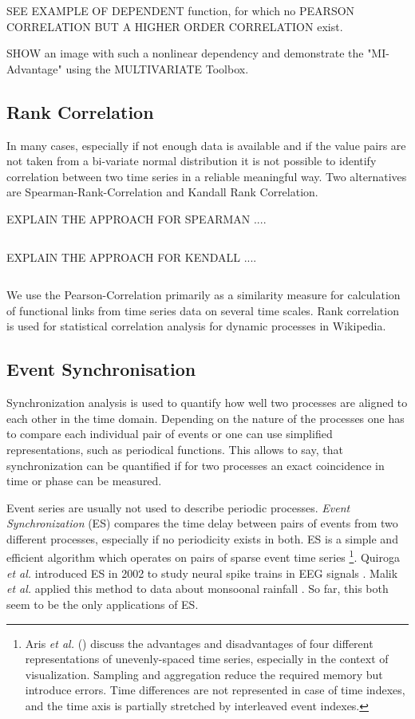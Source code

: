 \documentclass[a4paper,10pt]{scrbook}
\begin{document}
SEE EXAMPLE OF DEPENDENT function, for which no PEARSON CORRELATION BUT A HIGHER ORDER CORRELATION exist.

SHOW an image with such a nonlinear dependency and demonstrate the "MI-Advantage" using the MULTIVARIATE Toolbox. 




\subsection{Rank Correlation}
In many cases, especially if not enough data is available and if the value pairs are not taken from a bi-variate normal distribution it is not possible to identify correlation between two time series in a reliable meaningful way. Two alternatives are Spearman-Rank-Correlation and Kandall Rank Correlation.

EXPLAIN THE APPROACH FOR SPEARMAN ....

\begin{equation}
\label{spearman} 
\end{equation}

EXPLAIN THE APPROACH FOR KENDALL ....

\begin{equation}
\label{kendall} 
\end{equation}

We use the Pearson-Correlation primarily as a similarity measure for calculation of functional links from time series data on several time scales. Rank correlation is used for statistical correlation analysis for dynamic processes in Wikipedia.

\newpage
\clearpage
\subsection{Event Synchronisation}
\label{ES} 
Synchronization analysis is used to quantify how well two processes are aligned to each other in the time domain. Depending on the nature of the processes one has to compare each individual pair of events or one can use simplified representations, such as periodical functions. This allows to say, that synchronization can be quantified if for two processes an exact coincidence in time or phase can  be measured.


Event series are usually not used to describe periodic processes. \textit{Event Synchronization} (ES) compares the time delay between pairs of events from two different processes, especially if no periodicity exists in both. ES is a simple and efficient algorithm which operates on pairs of sparse event time series \footnote{Aris \textit{et al.} (\cite{Aris2005}) discuss the advantages and disadvantages of four different representations of unevenly-spaced time series, especially in the context of visualization. Sampling and aggregation reduce the required memory but introduce errors. Time differences are not represented in case of time indexes, and the time axis is partially stretched by interleaved event indexes.}. Quiroga \textit{et al.} introduced  ES in 2002 to study neural spike trains in EEG signals \cite{Quiroga2002}. Malik \textit{et al.} applied this method to data about monsoonal rainfall \cite{Malik2010,Malik2012}. So far, this both seem to be the only applications of ES. 
\end{document}

